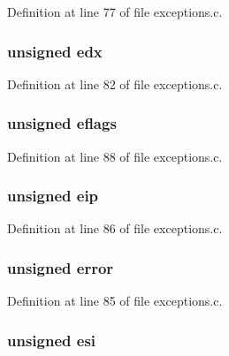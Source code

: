 Definition at line 77 of file exceptions.c.

\hypertarget{structregisters_ab1addf7d38e0c8a57015f07bd282130f}{
\subsubsection[{edx}]{\setlength{\rightskip}{0pt plus 5cm}unsigned {\bf edx}}}
\label{structregisters_ab1addf7d38e0c8a57015f07bd282130f}


Definition at line 82 of file exceptions.c.

\hypertarget{structregisters_a76117c5f5403e959cdaa62b640edaa02}{
\subsubsection[{eflags}]{\setlength{\rightskip}{0pt plus 5cm}unsigned {\bf eflags}}}
\label{structregisters_a76117c5f5403e959cdaa62b640edaa02}


Definition at line 88 of file exceptions.c.

\hypertarget{structregisters_a17f7bde379a0e9874a602e53b15d14e3}{
\subsubsection[{eip}]{\setlength{\rightskip}{0pt plus 5cm}unsigned {\bf eip}}}
\label{structregisters_a17f7bde379a0e9874a602e53b15d14e3}


Definition at line 86 of file exceptions.c.

\hypertarget{structregisters_aa25790aaf38769a83aeb3bf66ba2adc3}{
\subsubsection[{error}]{\setlength{\rightskip}{0pt plus 5cm}unsigned {\bf error}}}
\label{structregisters_aa25790aaf38769a83aeb3bf66ba2adc3}


Definition at line 85 of file exceptions.c.

\hypertarget{structregisters_a20d41899401bd0bfefa0873f3e1a3548}{
\subsubsection[{esi}]{\setlength{\rightskip}{0pt plus 5cm}unsigned {\bf esi}}}
\label{structregisters_a20d41899401bd0bfefa0873f3e1a3548}


